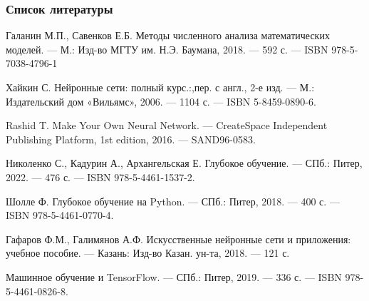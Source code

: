 \documentclass{beamer}
\begin{document}
\begin{frame}
	\frametitle{Список литературы}
	\vspace{-0.5em}
	\small
	\begin{thebibliography}{10}
		
	 Галанин М.П., Савенков Е.Б. Методы численного анализа математических моделей. — М.: Изд-во МГТУ им. Н.Э. Баумана, 2018. — 592 с. --- ISBN 978-5-7038-4796-1
	
	  Хайкин С. Нейронные сети: полный курс.:,пер. с англ., 2-е изд. — М.: Издательский дом «Вильямс», 2006. — 1104 с. — ISBN 5-8459-0890-6.
	
	 Rashid T. Make Your Own Neural Network. — CreateSpace Independent Publishing Platform, 1st edition, 2016. — SAND96-0583.
	
	 Николенко С., Кадурин А., Архангельская Е. Глубокое обучение. — СПб.: Питер, 2022. — 476 с. — ISBN 978-5-4461-1537-2.
	
	 Шолле Ф. Глубокое обучение на Python. — СПб.: Питер, 2018. — 400 с. — ISBN 978-5-4461-0770-4.
	
	\vspace{-0.1em}
	 Гафаров Ф.М., Галимянов А.Ф. Искусственные нейронные сети и приложения: учебное пособие. — Казань: Изд-во Казан. ун-та, 2018. — 121 с.
	
	\vspace{-0.1em}
	 Машинное обучение и TensorFlow. — СПб.: Питер, 2019. — 336 с. — ISBN 978-5-4461-0826-8.
	
	\end{thebibliography}
\end{frame}






\appendix
\end{document}
